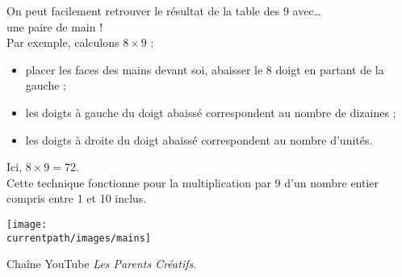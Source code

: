 \vspace*{-5mm}
\begin{changemargin}{-7mm}{-7mm}
    
    \begin{debat}
        \begin{minipage}{0.8\linewidth} 
            On peut facilement retrouver le résultat de la \og table des 9 \fg{} avec\dots{}\\
            une paire de main ! \\\medskip
            Par exemple, calculons $8\times9$ :
            \begin{itemize}
                \item placer les faces des mains devant soi, abaisser le 8 doigt en partant de la gauche ;
                \item les doigts à gauche du doigt abaissé correspondent au nombre de dizaines ;
                \item les doigts à droite du doigt abaissé correspondent au nombre d'unités.
            \end{itemize}
            Ici, $8\times9 =72$. \\\medskip
            Cette technique fonctionne pour la multiplication par 9 d'un nombre entier compris entre 1 et 10 inclus.
        \end{minipage}
        \hfill
        \begin{minipage}{0.15\linewidth}             
            \begin{center}
                \texttt{[image: \\currentpath/images/mains]}
            \end{center}
        \end{minipage}
        \begin{cadre}[B2][F4]
        \begin{center}
                
                \vspace*{2mm}
                Chaîne YouTube {\it Les Parents Créatifs}.
        \end{center}
        \end{cadre}
    \end{debat}
\end{changemargin}